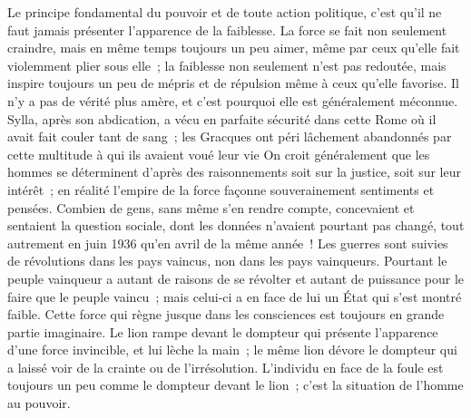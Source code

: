 \documentclass[french,twoside]{book} %
\begin{document}
Le principe fondamental du pouvoir et de toute action politique, c'est qu'il ne faut jamais présenter l'apparence de la faiblesse. La force se fait non seulement craindre, mais en même temps toujours un peu aimer, même par ceux qu'elle fait violemment plier sous elle ; la faiblesse non seulement n'est pas redoutée, mais inspire toujours un peu de mépris et de répulsion même à ceux qu'elle favorise. Il n'y a pas de vérité plus amère, et c'est pourquoi elle est généralement méconnue. Sylla, après son abdication, a vécu en parfaite sécurité dans cette Rome où il avait fait couler tant de sang ; les Gracques ont péri lâchement abandonnés par cette multitude à qui ils avaient voué leur vie On croit généralement que les hommes se déterminent d'après des raisonne­ments soit sur la justice, soit sur leur intérêt ; en réalité l'empire de la force façonne souverainement sentiments et pensées. Combien de gens, sans même s'en rendre compte, concevaient et sentaient la question sociale, dont les données n'avaient pourtant pas changé, tout autrement en juin 1936 qu'en avril de la même année ! Les guerres sont suivies de révolutions dans les pays vaincus, non dans les pays vainqueurs. Pourtant le peuple vainqueur a autant de raisons de se révolter et autant de puissance pour le faire que le peuple vaincu ; mais celui-ci a en face de lui un État qui s'est montré faible. Cette force qui règne jusque dans les consciences est toujours en grande partie imaginaire. Le lion rampe devant le dompteur qui présente l'apparence d'une force invincible, et lui lèche la main ; le même lion dévore le dompteur qui a laissé voir de la crainte ou de l'irrésolution. L'individu en face de la foule est toujours un peu comme le dompteur devant le lion ; c'est la situation de l'homme au pouvoir.\par

\begin{center}
\end{center}
\end{document}
